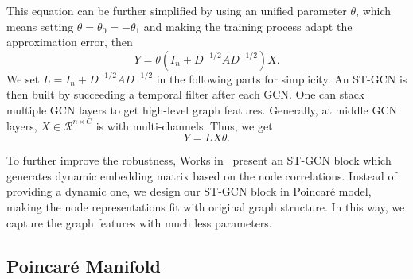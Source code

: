 \documentclass[letterpaper]{article} \usepackage{aaai19}  \usepackage{times}  \usepackage{helvet} \usepackage{courier}  \usepackage[hyphens]{url}  \usepackage{graphicx} \urlstyle{rm} \def\UrlFont{\rm}  \usepackage{graphicx}  \frenchspacing  \setlength{\pdfpagewidth}{8.5in}  \setlength{\pdfpageheight}{11in}
\begin{document}
\noindent This equation can be further simplified by using an unified parameter $\theta$, which means setting $\theta = \theta_0 = - \theta_1$ and making the training process adapt the approximation error, then 
\begin{equation}
    Y = \theta(I_n + D^{-1/2}AD^{-1/2})X.
\end{equation}
We set  $ L = I_n + D^{-1/2}AD^{-1/2}$ in the following parts for simplicity. An ST-GCN is then built by succeeding a temporal filter after each GCN. One can stack multiple GCN layers to get high-level graph features. Generally, at middle GCN layers, $X\in \mathcal{R}^{n\times C}$ is with multi-channels. Thus, we get
\begin{equation}\label{eq:gcn}
    Y = LX\theta.
\end{equation}

To further improve the robustness, Works in~\cite{shi2019two,peng2020learning} present an ST-GCN block which generates dynamic embedding matrix based on the node correlations.  Instead of providing a dynamic one, we design our ST-GCN block in Poincar\'e model, making the node representations fit with original graph structure. In this way, we capture the graph features with much less parameters.

\subsection{Poincar\'e Manifold}
\end{document}
